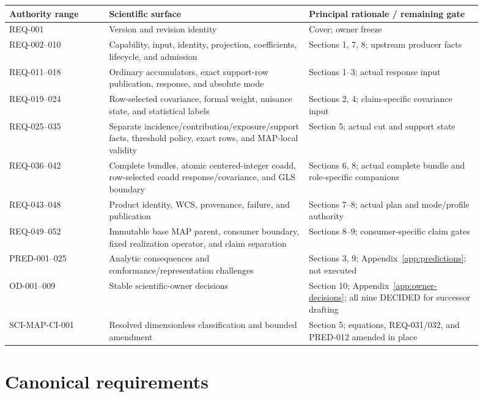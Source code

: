 \documentclass[10pt]{article}
\begin{document}
\begin{longtable}{L{0.19\linewidth}L{0.38\linewidth}L{0.33\linewidth}}
\toprule
Authority range & Scientific surface & Principal rationale / remaining gate\\
\midrule
REQ-001 & Version and revision identity & Cover; owner freeze\\
REQ-002--010 & Capability, input, identity, projection, coefficients, lifecycle,
and admission & Sections 1, 7, 8; upstream producer facts\\
REQ-011--018 & Ordinary accumulators, exact support-row publication, response,
and absolute mode & Sections 1--3; actual response input\\
REQ-019--024 & Row-selected covariance, formal weight, nuisance state, and
statistical labels & Sections 2, 4; claim-specific covariance input\\
REQ-025--035 & Separate incidence/contribution/exposure/support facts,
threshold policy, exact rows, and MAP-local validity & Section 5; actual cut
and support state\\
REQ-036--042 & Complete bundles, atomic centered-integer coadd, row-selected
coadd response/covariance, and GLS boundary & Sections 6, 8; actual complete
bundle and role-specific companions\\
REQ-043--048 & Product identity, WCS, provenance, failure, and publication &
Sections 7--8; actual plan and mode/profile authority\\
REQ-049--052 & Immutable base MAP parent, consumer boundary, fixed realization
operator, and claim separation & Sections 8--9; consumer-specific claim gates\\
PRED-001--025 & Analytic consequences and conformance/representation challenges
& Sections 3, 9; Appendix~\ref{app:predictions}; not executed\\
OD-001--009 & Stable scientific-owner decisions & Section 10;
Appendix~\ref{app:owner-decisions}; all nine DECIDED for successor drafting\\
SCI-MAP-CI-001 & Resolved dimensionless classification and bounded amendment &
Section 5; equations, REQ-031/032, and PRED-012 amended in place\\
\bottomrule
\end{longtable}

\clearpage
\section{Canonical requirements}\label{app:requirements}
\end{document}

